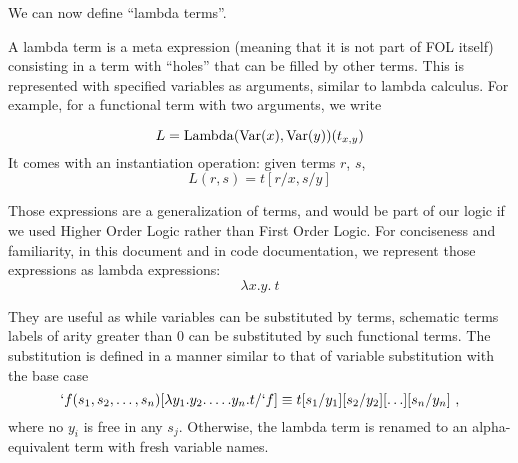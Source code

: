 We can now define \enquote{lambda terms}.
\begin{defin}
  A lambda term is a  meta expression (meaning that it is not part of FOL itself) consisting in a term with ``holes'' that can be filled by other terms. This is represented with specified variables as arguments, similar to lambda calculus. For example, for a functional term with two arguments, we write

  $$
    L = \operatorname{Lambda}(\operatorname{Var}(x), \operatorname{Var}(y))(t_{x,y})
  $$
  It comes with an instantiation operation: given terms $r$, $s$,
  $$L(r, s) = t[r/x, s/y]$$
\end{defin}
Those expressions are a generalization of terms, and would be part of our logic if we used Higher Order Logic rather than First Order Logic. For conciseness and familiarity, in this document and in code documentation, we represent those expressions as lambda expressions:
$$
  \lambda x.y. ~t
$$

They are useful as while variables can be substituted by terms, schematic terms labels of arity greater than 0 can be substituted by such functional terms. 
The substitution is defined in a manner similar to that of variable substitution with the base case
%
\begin{equation*}
  `f(s_1, s_2, \ldots, s_n)[\lambda y_1.y_2.\ldots.y_n. t/`f] \equiv t[s_1/y_1][s_2/y_2][\ldots][s_n/y_n]~,
\end{equation*}
%
where no $y_i$ is free in any $s_j$. Otherwise, the lambda term is renamed to an alpha-equivalent term with fresh variable names.

